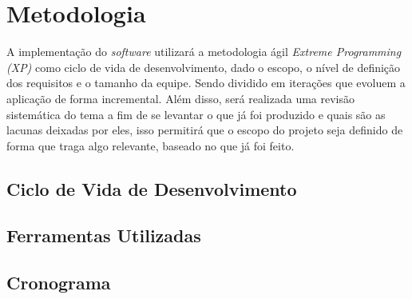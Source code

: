 \chapter[Metodologia]{Metodologia}

  A implementação do \textit{software} utilizará a metodologia ágil \textit{Extreme Programming (XP)} como ciclo de vida de desenvolvimento, dado o escopo, o nível de definição dos requisitos e o tamanho da equipe. Sendo dividido em iterações que evoluem a aplicação de forma incremental. Além disso, será realizada uma revisão sistemática do tema a fim de se levantar o que já foi produzido e quais são as lacunas deixadas por eles, isso permitirá que o escopo do projeto seja definido de forma que traga algo relevante, baseado no que já foi feito.

  \section[Ciclo de Vida de Desenvolvimento]{Ciclo de Vida de Desenvolvimento}
  \section[Ferramentas Utilizadas]{Ferramentas Utilizadas}
  \section[Cronograma]{Cronograma}
